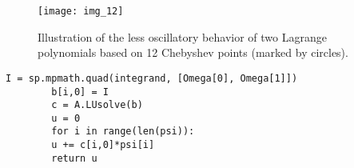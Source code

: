 \documentclass[../main.tex]{subfiles}
\begin{document}
	\begin{figure}[H]
		\centering
		\texttt{[image: img\_12]}
		\caption{Illustration of the less oscillatory behavior of two Lagrange polynomials based on 12 Chebyshev points (marked by circles).}
		\label{fig:img_12}
	\end{figure}
	\begin{lstlisting}[numbers=none]
		I = sp.mpmath.quad(integrand, [Omega[0], Omega[1]])
		b[i,0] = I
		c = A.LUsolve(b)
		u = 0
		for i in range(len(psi)):
		u += c[i,0]*psi[i]
		return u
	\end{lstlisting}
	
\end{document}
